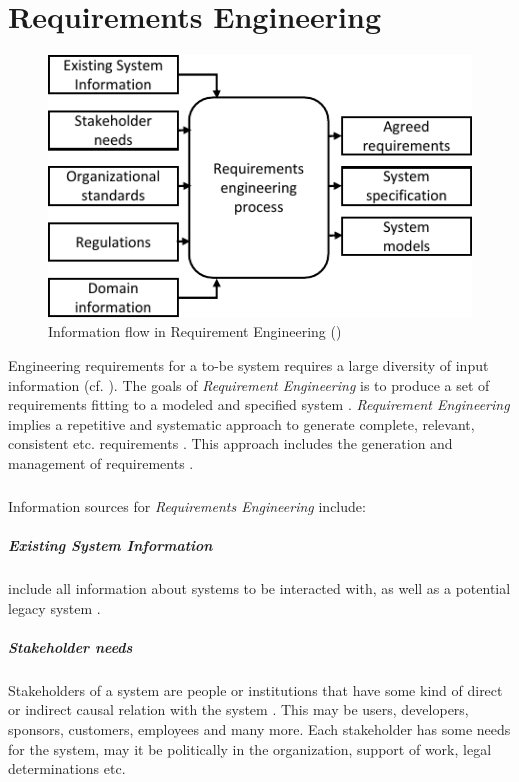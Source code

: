 \chapter{Requirements Engineering}
\begin{figure}[H]
    \centering
    \includegraphics[scale=1.3]{img/RequirementInformationStream.pdf}
    \caption[Information flow in Requirements Engineering]{Information flow in Requirement Engineering (\protect\cite[28]{Kotonya.2000})}
    \label{fig:reqFlow}
\end{figure}
Engineering requirements for a to-be system requires a large diversity of input information (cf. ). The goals of \textit{Requirement Engineering} is to produce a set of requirements fitting to a modeled and specified system \parencite[cf.][262]{Pohl.2007}. \textit{Requirement Engineering} implies a repetitive and systematic approach to generate complete, relevant, consistent etc. requirements \parencite[5]{Sommerville.2000}. This approach includes the generation and management of requirements \parencite[262]{Pohl.2007}.
\paragraph*{}
Information sources for \textit{Requirements Engineering} include:
\paragraph*{Existing System Information} include all information about systems to be interacted with, as well as a potential legacy system \parencite[cf.][28]{Kotonya.2000}.
\paragraph*{Stakeholder needs} Stakeholders of a system are people or institutions that have some kind of direct or indirect causal relation with the system \parencite[cf.][8]{Sommerville.2000}. This may be users, developers, sponsors, customers, employees and many more. Each stakeholder has some needs for the system, may it be politically in the organization, support of work, legal determinations etc. \parencites[cf.][28]{Kotonya.2000}[cf.][350-351]{Lauesen.2008}
